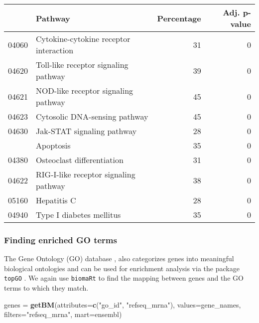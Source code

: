 \documentclass[9pt,a4paper,]{extarticle}
\newenvironment{Shaded}{\begin{snugshade}}{\end{snugshade}}
\newcommand{\DataTypeTok}[1]{\textcolor[rgb]{0.13,0.29,0.53}{#1}}
\newcommand{\KeywordTok}[1]{\textcolor[rgb]{0.13,0.29,0.53}{\textbf{#1}}}
\newcommand{\NormalTok}[1]{#1}
\newcommand{\StringTok}[1]{\textcolor[rgb]{0.31,0.60,0.02}{#1}}
\begin{document}
\begin{table}[H]
\centering\begingroup\fontsize{7}{9}\selectfont

\begin{tabular}{llrr}
\toprule
  & Pathway & Percentage & Adj. p-value\\
\midrule
04060 & Cytokine-cytokine receptor interaction & 31 & 0\\
04620 & Toll-like receptor signaling pathway & 39 & 0\\
04621 & NOD-like receptor signaling pathway & 45 & 0\\
04623 & Cytosolic DNA-sensing pathway & 45 & 0\\
04630 & Jak-STAT signaling pathway & 28 & 0\\
\addlinespace
04210 & Apoptosis & 35 & 0\\
04380 & Osteoclast differentiation & 31 & 0\\
04622 & RIG-I-like receptor signaling pathway & 38 & 0\\
05160 & Hepatitis C & 28 & 0\\
04940 & Type I diabetes mellitus & 35 & 0\\
\bottomrule
\end{tabular}
\endgroup{}
\end{table}

\hypertarget{finding-enriched-go-terms}{%
\subsubsection{Finding enriched GO terms}\label{finding-enriched-go-terms}}

The Gene Ontology (GO) database \citep{GO}, also categorizes genes into meaningful
biological ontologies and can be used for enrichment analysis via the package
\texttt{topGO} \citep{alexa:topgo}. We again use \texttt{biomaRt} to find the mapping between
genes and the GO terms to which they match.

\begin{Shaded}
\begin{Highlighting}[]
\NormalTok{genes =}\StringTok{ }\KeywordTok{getBM}\NormalTok{(}\DataTypeTok{attributes=}\KeywordTok{c}\NormalTok{(}\StringTok{"go_id"}\NormalTok{, }\StringTok{"refseq_mrna"}\NormalTok{),}
          \DataTypeTok{values=}\NormalTok{gene_names,}
          \DataTypeTok{filters=}\StringTok{"refseq_mrna"}\NormalTok{,}
          \DataTypeTok{mart=}\NormalTok{ensembl)}
\end{Highlighting}
\end{Shaded}
\end{document}
